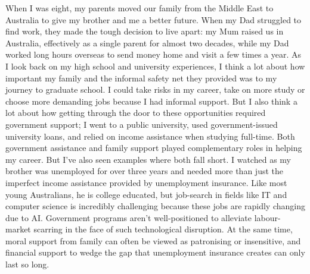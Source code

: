 When I was eight, my parents moved our family from the Middle East to Australia to give my brother and me a better future. When my Dad struggled to find work, they made the tough decision to live apart: my Mum raised us in Australia, effectively as a single parent for almost two decades, while my Dad worked long hours overseas to send money home and visit a few times a year.
\psbreak
As I look back on my high school and university experiences, I think a lot about how important my family and the informal safety net they provided was to my journey to graduate school. I could take risks in my career, take on more study or choose more demanding jobs because I had informal support. But I also think a lot about how getting through the door to these opportunities required government support; I went to a public university, used government-issued university loans, and relied on income assistance when studying full-time. Both government assistance and family support played complementary roles in helping my career.
\psbreak
But I've also seen examples where both fall short. I watched as my brother was unemployed for over three years and needed more than just the imperfect income assistance provided by unemployment insurance. Like most young Australians, he is college educated, but job-search in fields like IT and computer science is incredibly challenging because these jobs are rapidly changing due to AI. Government programs aren't well-positioned to alleviate labour-market scarring in the face of such technological disruption. At the same time, moral support from family can often be viewed as patronising or insensitive, and financial support to wedge the gap that unemployment insurance creates can only last so long.